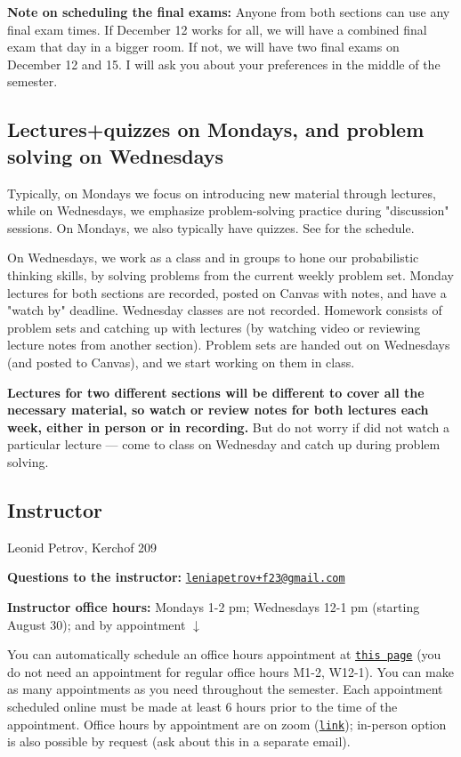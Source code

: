 \documentclass[oneside,11pt]{amsart}
\begin{document}
\medskip

\textbf{Note on scheduling the final exams:} Anyone from both sections can use any final exam times. If December 12 works for all, we will have a combined final exam that day in a bigger room. If not, we will have two final exams on December 12 and 15. I will ask you about your preferences in the middle of the semester.


\subsection{Lectures+quizzes on Mondays, and problem solving on Wednesdays}
Typically, on Mondays we focus on introducing new material through lectures, while on Wednesdays, we emphasize problem-solving practice during "discussion" sessions. On Mondays, we also typically have quizzes. See  for the schedule.

On Wednesdays, we work as a class and in groups to hone our probabilistic thinking skills, by solving problems from the current weekly problem set. Monday lectures for both sections are recorded, posted on Canvas with notes, and have a "watch by" deadline. Wednesday classes are not recorded. Homework consists of problem sets and catching up with lectures (by watching video or reviewing lecture notes from another section). Problem sets are handed out on Wednesdays (and posted to Canvas), and we start working on them in class.

\textbf{Lectures for two different sections will be different to cover all the necessary material, so watch or review notes for both lectures each week, either in person or in recording.} But do not worry if did not watch a particular lecture --- come to class on Wednesday and catch up during problem solving.



\subsection{Instructor}

Leonid Petrov, Kerchof 209

\textbf{Questions to the instructor:} \href{mailto:leniapetrov+f23@gmail.com}{\texttt{leniapetrov+f23@gmail.com}}

\textbf{Instructor office hours:} 
Mondays 1-2 pm; Wednesdays 12-1 pm (starting August 30); and by appointment $\downarrow$

You can automatically schedule an office hours appointment 
at \href{https://lpetrov.cc/teaching/}{\texttt{this page}} (you do not need an appointment for 
regular office hours M1-2, W12-1).
You can make as many appointments as you need throughout the semester.
Each appointment scheduled online
must be made at least 6 hours prior to the time of the appointment.
Office hours by appointment are on zoom (\href{https://virginia.zoom.us/j/97731277583?pwd=UFNvZ0NHNWRRaHpPTGYrTnJiZ3Rpdz09}{\texttt{link}}); 
in-person option is also possible by request (ask about this in a separate email).
\end{document}
